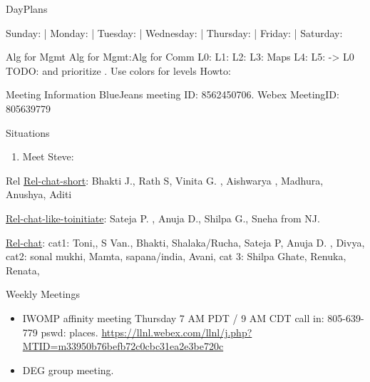 \begin{columns}
\begin{column}{0.6\linewidth}
\begin{block}{DayPlans} 

  Sunday:   
  | Monday: 
  | Tuesday:  
  | Wednesday: 
  | Thursday: 
| Friday: 
| Saturday:  
\end{block}

\begin{block}{Alg for Mgmt}
Alg for Mgmt:Alg for Comm   L0:  L1:  L2:  L3:  Maps L4: L5: -> L0
TODO:  and prioritize . Use colors for levels Howto:  
\end{block} 

\begin{block}{Meeting Information}
BlueJeans meeting ID: 8562450706.
Webex MeetingID: 805639779  
\end{block} 

\begin{block}{Situations} 
\begin{enumerate}
\item Meet Steve: 
\end{enumerate} 
\end{block}

\begin{block}{Rel}
\underline{Rel-chat-short}: Bhakti J., Rath S, Vinita G. , Aishwarya , Madhura, Anushya, Aditi 

\underline{Rel-chat-like-toinitiate}: Sateja P. , Anuja D., Shilpa G., Sneha from NJ. 

\underline{Rel-chat}:  cat1:  Toni,, S Van., Bhakti, Shalaka/Rucha, Sateja P, Anuja
D. ,  Divya, cat2: sonal mukhi, Mamta, sapana/india, Avani, cat 3:
Shilpa Ghate, Renuka, Renata, 
\end{block}
  
  \begin{block}{Weekly Meetings}
    \begin{itemize}
      \tiny \item \tiny IWOMP affinity meeting Thursday 7 AM PDT / 9 AM
      CDT call in: 805-639-779 pswd: places. \url{https://llnl.webex.com/llnl/j.php?MTID=m33950b76befb72c0cbc31ea2e3be720c}
    \item \tiny DEG group meeting.          \end{itemize}
  \end{block} 


\end{column}
\end{columns}
